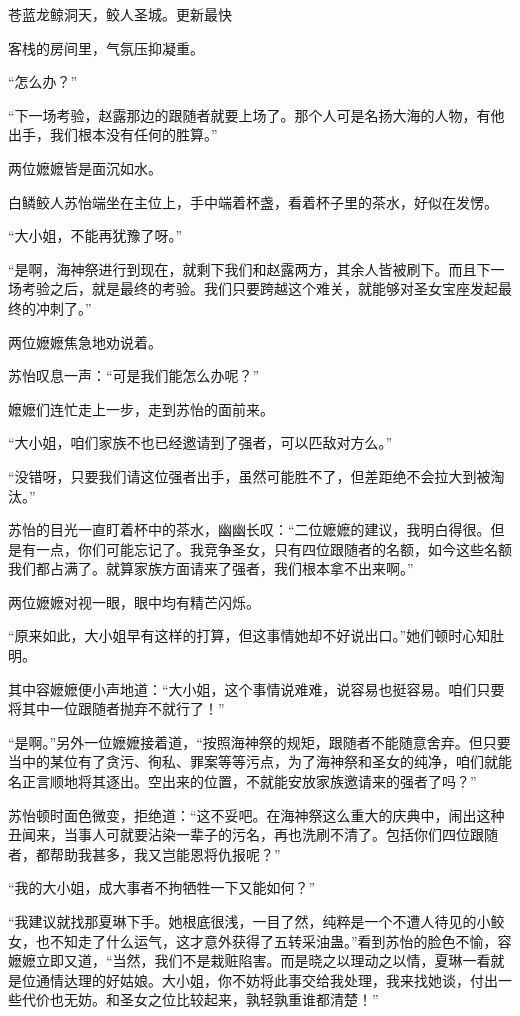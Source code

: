 
\begin{this_body}

苍蓝龙鲸洞天，鲛人圣城。更新最快

客栈的房间里，气氛压抑凝重。

“怎么办？”

“下一场考验，赵露那边的跟随者就要上场了。那个人可是名扬大海的人物，有他出手，我们根本没有任何的胜算。”

两位嬷嬷皆是面沉如水。

白鳞鲛人苏怡端坐在主位上，手中端着杯盏，看着杯子里的茶水，好似在发愣。

“大小姐，不能再犹豫了呀。”

“是啊，海神祭进行到现在，就剩下我们和赵露两方，其余人皆被刷下。而且下一场考验之后，就是最终的考验。我们只要跨越这个难关，就能够对圣女宝座发起最终的冲刺了。”

两位嬷嬷焦急地劝说着。

苏怡叹息一声：“可是我们能怎么办呢？”

嬷嬷们连忙走上一步，走到苏怡的面前来。

“大小姐，咱们家族不也已经邀请到了强者，可以匹敌对方么。”

“没错呀，只要我们请这位强者出手，虽然可能胜不了，但差距绝不会拉大到被淘汰。”

苏怡的目光一直盯着杯中的茶水，幽幽长叹：“二位嬷嬷的建议，我明白得很。但是有一点，你们可能忘记了。我竞争圣女，只有四位跟随者的名额，如今这些名额我们都占满了。就算家族方面请来了强者，我们根本拿不出来啊。”

两位嬷嬷对视一眼，眼中均有精芒闪烁。

“原来如此，大小姐早有这样的打算，但这事情她却不好说出口。”她们顿时心知肚明。

其中容嬷嬷便小声地道：“大小姐，这个事情说难难，说容易也挺容易。咱们只要将其中一位跟随者抛弃不就行了！”

“是啊。”另外一位嬷嬷接着道，“按照海神祭的规矩，跟随者不能随意舍弃。但只要当中的某位有了贪污、徇私、罪案等等污点，为了海神祭和圣女的纯净，咱们就能名正言顺地将其逐出。空出来的位置，不就能安放家族邀请来的强者了吗？”

苏怡顿时面色微变，拒绝道：“这不妥吧。在海神祭这么重大的庆典中，闹出这种丑闻来，当事人可就要沾染一辈子的污名，再也洗刷不清了。包括你们四位跟随者，都帮助我甚多，我又岂能恩将仇报呢？”

“我的大小姐，成大事者不拘牺牲一下又能如何？”

“我建议就找那夏琳下手。她根底很浅，一目了然，纯粹是一个不遭人待见的小鲛女，也不知走了什么运气，这才意外获得了五转采油蛊。”看到苏怡的脸色不愉，容嬷嬷立即又道，“当然，我们不是栽赃陷害。而是晓之以理动之以情，夏琳一看就是位通情达理的好姑娘。大小姐，你不妨将此事交给我处理，我来找她谈，付出一些代价也无妨。和圣女之位比较起来，孰轻孰重谁都清楚！”


\end{this_body}
